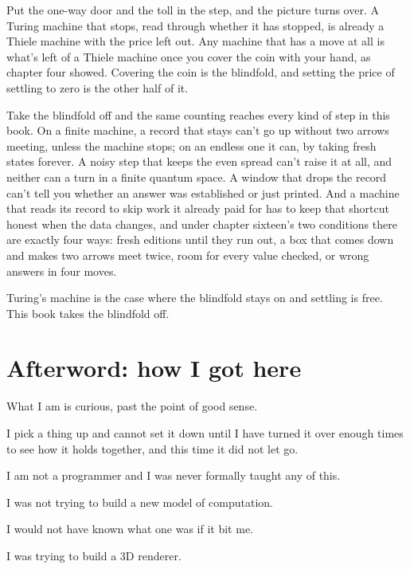 \documentclass[11pt,twoside]{article}
\theoremstyle{thielethm}
\theoremstyle{thieledef}
\theoremstyle{thieledef}
\theoremstyle{thieledef}
\theoremstyle{thielethm}
\theoremstyle{thieleobs}
\theoremstyle{thielethm}
\begin{document}
Put the one-way door and the toll in the step, and the picture turns over. A Turing machine that stops, read through whether it has stopped, is already a Thiele machine with the price left out. Any machine that has a move at all is what's left of a Thiele machine once you cover the coin with your hand, as chapter four showed. Covering the coin is the blindfold, and setting the price of settling to zero is the other half of it.

Take the blindfold off and the same counting reaches every kind of step in this book. On a finite machine, a record that stays can't go up without two arrows meeting, unless the machine stops; on an endless one it can, by taking fresh states forever. A noisy step that keeps the even spread can't raise it at all, and neither can a turn in a finite quantum space. A window that drops the record can't tell you whether an answer was established or just printed. And a machine that reads its record to skip work it already paid for has to keep that shortcut honest when the data changes, and under chapter sixteen's two conditions there are exactly four ways: fresh editions until they run out, a box that comes down and makes two arrows meet twice, room for every value checked, or wrong answers in four moves.

Turing's machine is the case where the blindfold stays on and settling is free. This book takes the blindfold off.

\section*{Afterword: how I got here}
\label{sec:origin}

What I am is curious, past the point of good sense.

I pick a thing up and cannot set it down until I have turned it over enough times to see how it holds together, and this time it did not let go.

I am not a programmer and I was never formally taught any of this.

I was not trying to build a new model of computation.

I would not have known what one was if it bit me.

I was trying to build a 3D renderer.
\end{document}
